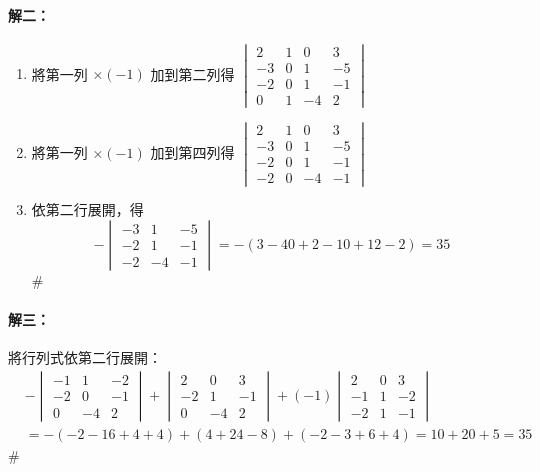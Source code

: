 \paragraph{解二：}
\begin{enumerate}[label=(\roman*)]
  \item 將第一列 $\times (-1)$ 加到第二列得 $\begin{vmatrix} 2 & 1 & 0 & 3 \\ -3 & 0 & 1 & -5 \\ -2 & 0 & 1 & -1 \\ 0 & 1 & -4 & 2 \end{vmatrix}$
  \item 將第一列 $\times (-1)$ 加到第四列得 $\begin{vmatrix} 2 & 1 & 0 & 3 \\ -3 & 0 & 1 & -5 \\ -2 & 0 & 1 & -1 \\ -2 & 0 & -4 & -1 \end{vmatrix}$
  \item 依第二行展開，得
  \[ - \begin{vmatrix} -3 & 1 & -5 \\ -2 & 1 & -1 \\ -2 & -4 & -1 \end{vmatrix} = -(3-40+2-10+12-2) = 35 \]\hfill$\#$
\end{enumerate}

\paragraph{解三：}將行列式依第二行展開：
\begin{align*}
&- \begin{vmatrix} -1 & 1 & -2 \\ -2 & 0 & -1 \\ 0 & -4 & 2 \end{vmatrix} + \begin{vmatrix} 2 & 0 & 3 \\ -2 & 1 & -1 \\ 0 & -4 & 2 \end{vmatrix} + (-1) \begin{vmatrix} 2 & 0 & 3 \\ -1 & 1 & -2 \\ -2 & 1 & -1 \end{vmatrix} \\
&= -(-2-16+4+4) + (4+24-8) + (-2-3+6+4) = 10 + 20 + 5 = 35
\end{align*}
\hfill$\#$

